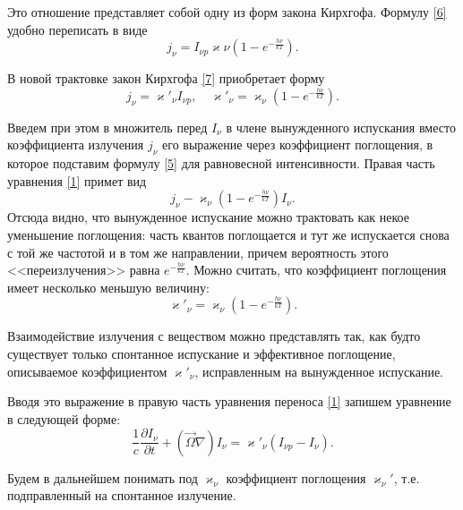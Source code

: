 Это отношение представляет собой одну из форм закона Кирхгофа. Формулу \eqref{6} удобно переписать в виде
\begin {equation}
j_{\nu} = I_{\nu p}\varkappa{\nu}(1-e^{-\frac{h\nu}{kT}}).
\label{7}
\end {equation}

В новой трактовке закон Кирхгофа \eqref{7} приобретает форму
\begin {equation}
j_{\nu} = \varkappa'_{\nu}I_{\nu p}, \quad \varkappa'_{\nu} = \varkappa_{\nu}(1 - e^{-\frac{h\nu}{kT}}).
\end {equation}

Введем при этом в множитель перед $I_{\nu}$ в члене вынужденного испускания вместо коэффициента излучения $j_{\nu}$ его выражение через коэффициент поглощения, в которое подставим формулу \eqref{5} для равновесной интенсивности. Правая часть уравнения \eqref{1} примет вид 
\begin {equation}
j_{\nu} - \varkappa_{\nu}(1 - e^{-\frac{h\nu}{kT}})I_{\nu}.
\end {equation}
Отсюда видно, что вынужденное испускание можно трактовать как некое уменьшение поглощения: часть квантов поглощается и тут же испускается снова с той же частотой и в том же направлении, причем вероятность этого <<переизлучения>> равна $e^{-\frac{h\nu}{kT}}$. Можно считать, что коэффициент поглощения имеет несколько меньшую величину:
\begin {equation}
\varkappa'_{\nu} = \varkappa_{\nu}(1 - e^{-\frac{h\nu}{kT}}).
\end {equation}

Взаимодействие излучения с веществом можно представлять так, как будто существует только спонтанное испускание и эффективное поглощение, описываемое коэффициентом $\varkappa'_{\nu}$, исправленным на вынужденное испускание. 

Вводя это выражение в правую часть уравнения переноса \eqref{1} запишем уравнение в следующей форме:
\begin {equation}
\frac{1}{c}\frac{\partial I_{\nu}}{\partial t} + (\vec\Omega \nabla) I_{\nu} = \varkappa'_{\nu} (I_{\nu p} - I_{\nu}).
\label{2}
\end {equation}

Будем в дальнейшем понимать под $\varkappa_\nu$ коэффициент поглощения $\varkappa_\nu'$, т.е. подправленный на спонтанное излучение.
